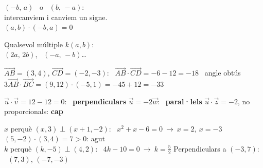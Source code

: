 \documentclass[11pt,a4paper]{article}
\newcommand{\comic}{\fontfamily{ComicNeue-TLF}\selectfont}
\newcommand{\nota}[1]{{\comic\small\color{fmex!85!black}#1}}
\newcommand{\vect}[1]{\overrightarrow{#1}}
\begin{document}
\vfill
\begin{tcbraster}[raster columns=2,raster equal height,raster column skip=10pt]
\begin{tcolorbox}[fmbase,colback=fmK!8,colframe=fmK,coltitle=white,title={Perpendicular a $(a,b)$}]
\begin{minipage}[c]{0.55\linewidth}$(-b,\,a)$ \ o \ $(b,\,-a)$:\\ intercanviem i canviem un signe.\\[2pt] \small$(a,b)\cdot(-b,a)=0$\end{minipage}\hfill
\begin{minipage}[c]{0.4\linewidth}\centering{}\end{minipage}
\end{tcolorbox}
\begin{tcolorbox}[fmbase,colback=fmB!8,colframe=fmB,coltitle=white,title={Paral·lel a $(a,b)$}]
Qualsevol múltiple $k(a,b)$:\\ $(2a,\,2b)$, \ $(-a,\,-b)$\dots
\end{tcolorbox}
\end{tcbraster}

\vfill
\begin{exemple}[Exemple: \ $A(2,-1)$, $B(5,3)$, $C(0,4)$, $D(-2,1)$]
$\vect{AB}=(3,4)$, $\vect{CD}=(-2,-3)$: \ $\vect{AB}\cdot\vect{CD}=-6-12=\boxed{-18}$ \ \nota{angle obtús}\\[3pt]
$3\vect{AB}\cdot\vect{BC}=(9,12)\cdot(-5,1)=-45+12=\boxed{-33}$
\end{exemple}

\vfill
\begin{exemple}[Exemple: \ $\vec u=(4,-6)$ amb $\vec v=(3,2)$, $\vec w=(-2,3)$, $\vec z=(1,1)$]
$\vec u\cdot\vec v=12-12=0$: \ \textbf{perpendiculars} \qquad $\vec u=-2\vec w$: \ \textbf{paral·lels} \qquad $\vec u\cdot\vec z=-2$, no proporcionals: \textbf{cap}
\end{exemple}

\vfill
\begin{exemple}[Exemples]
$x$ perquè $(x,3)\perp(x+1,-2)$: \ $x^2+x-6=0\ \to\ x=2,\ x=-3$ \qquad $(5,-2)\cdot(3,4)=7>0$: agut\\[4pt]
$k$ perquè $(k,-5)\perp(4,2)$: \ $4k-10=0\ \to\ k=\frac52$ \qquad Perpendiculars a $(-3,7)$: \ $(7,3)$, $(-7,-3)$
\end{exemple}
\end{document}
